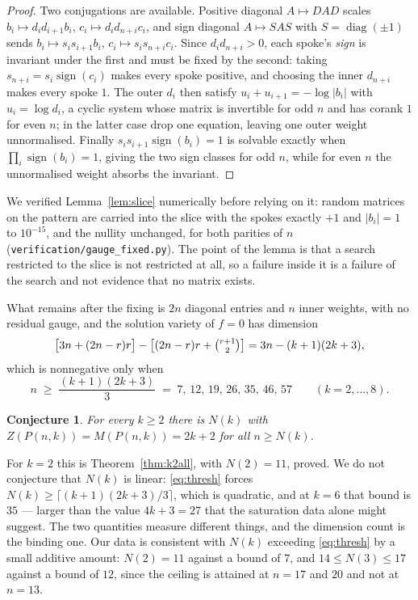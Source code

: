 \documentclass[11pt]{article}
\newtheorem{conjecture}[theorem]{Conjecture}
\theoremstyle{definition}
\begin{document}
\begin{proof}
Two conjugations are available. Positive diagonal $A\mapsto DAD$ scales
$b_i\mapsto d_id_{i+1}b_i$, $c_i\mapsto d_id_{n+i}c_i$, and sign diagonal
$A\mapsto SAS$ with $S=\operatorname{diag}(\pm1)$ sends
$b_i\mapsto s_is_{i+1}b_i$, $c_i\mapsto s_is_{n+i}c_i$. Since $d_id_{n+i}>0$,
each spoke's \emph{sign} is invariant under the first and must be fixed by the
second: taking $s_{n+i}=s_i\operatorname{sign}(c_i)$ makes every spoke positive,
and choosing the inner $d_{n+i}$ makes every spoke $1$. The outer $d_i$ then
satisfy $u_i+u_{i+1}=-\log|b_i|$ with $u_i=\log d_i$, a cyclic system whose
matrix is invertible for odd $n$ and has corank $1$ for even $n$; in the latter
case drop one equation, leaving one outer weight unnormalised. Finally
$s_is_{i+1}\operatorname{sign}(b_i)=1$ is solvable exactly when
$\prod_i\operatorname{sign}(b_i)=1$, giving the two sign classes for odd $n$,
while for even $n$ the unnormalised weight absorbs the invariant.
\end{proof}

\noindent
We verified Lemma~\ref{lem:slice} numerically before relying on it: random
matrices on the pattern are carried into the slice with the spokes exactly $+1$
and $|b_i|=1$ to $10^{-15}$, and the nullity unchanged, for both parities of $n$
(\texttt{verification/gauge\_fixed.py}). The point of the lemma is that a search
restricted to the slice is not restricted at all, so a failure inside it is a
failure of the search and not evidence that no matrix exists.

What remains after the fixing is $2n$ diagonal entries and $n$ inner weights,
with no residual gauge, and the solution variety of $f=0$ has dimension
\[
  \bigl[3n+(2n-r)r\bigr]-\bigl[(2n-r)r+\tbinom{r+1}2\bigr]
  =3n-(k+1)(2k+3),
\]
which is nonnegative only when
\begin{equation}\label{eq:thresh}
  n\;\ge\;\frac{(k+1)(2k+3)}{3}\;=\;7,\,12,\,19,\,26,\,35,\,46,\,57
  \qquad(k=2,\dots,8).
\end{equation}

\begin{conjecture}\label{conj:generaln}
For every $k\ge2$ there is $N(k)$ with $Z(P(n,k))=M(P(n,k))=2k+2$ for all
$n\ge N(k)$.
\end{conjecture}

\noindent
For $k=2$ this is Theorem~\ref{thm:k2all}, with $N(2)=11$, proved. We do not
conjecture that $N(k)$ is linear: \eqref{eq:thresh} forces
$N(k)\ge\lceil(k+1)(2k+3)/3\rceil$, which is quadratic, and at $k=6$ that bound
is $35$ --- larger than the value $4k+3=27$ that the saturation data alone might
suggest. The two quantities measure different things, and the dimension count is
the binding one. Our data is consistent with $N(k)$ exceeding
\eqref{eq:thresh} by a small additive amount: $N(2)=11$ against a bound of $7$,
and $14\le N(3)\le17$ against a bound of $12$, since the ceiling is attained at
$n=17$ and $20$ and not at $n=13$.
\end{document}
